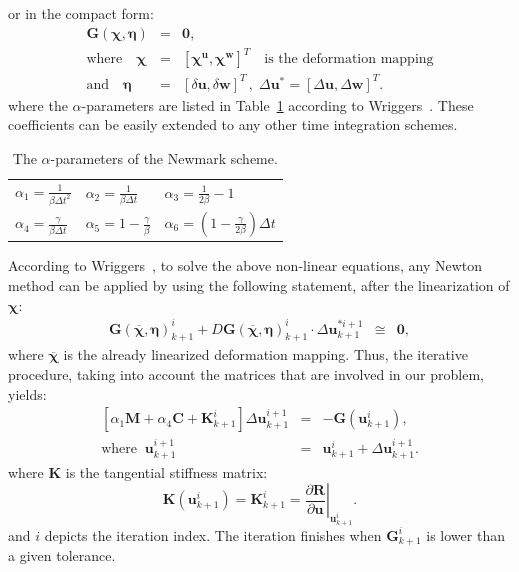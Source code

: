 \documentclass[preprint,12pt,a4paper]{elsarticle}
\begin{document}
or  in the compact form:
\begin{eqnarray} \label{eq_uw23}
\boldsymbol{G}(\boldsymbol{\chi},\boldsymbol{\eta})&=&\boldsymbol{0},\\
\mbox{where} \quad \boldsymbol{\chi}&=&\left[ \boldsymbol{\chi^u} ,\boldsymbol{\chi^w}\right]^{T} \quad  \mbox{is the deformation mapping}
\nonumber \\
\mbox{and} \quad 
\boldsymbol{\eta}&=&\left[\delta\boldsymbol{u},\delta\boldsymbol{w}\right]^T \, , \; \Delta\boldsymbol{u^*}=\left[\Delta\boldsymbol{u},\Delta\boldsymbol{w}\right]^T.
\nonumber
\end{eqnarray}
where the $\alpha$-parameters are listed in Table~\ref{tab1} according to Wriggers~\cite{wriggers:08}. These coefficients can be easily extended to any other time integration schemes. 

\begin{table}
\caption{\label{tab1} The $\alpha$-parameters of the Newmark scheme.} 
\centering
	\begin{tabular}{lll}
	 $\alpha_1=\frac{1}{\beta\Delta t^2}$ & 	 $\alpha_2=\frac{1}{\beta\Delta t}$ & 
	 $\alpha_3=\frac{1}{2\beta}-1$ \\
	 $\alpha_4=\frac{\gamma}{\beta\Delta t}$ &  
	 	 $\alpha_5=1-\frac{\gamma}{\beta}$&
	 $\alpha_6=\left(1-\frac{\gamma}{2\beta}\right)\Delta t$
	\end{tabular}
\end{table}

According to Wriggers~\cite{wriggers:08}, to solve the above non-linear equations, any Newton method  can be applied by using the following statement, after the linearization of $ \boldsymbol{\chi}$: 
\begin{eqnarray} \label{eq_uw24}
\boldsymbol{G}(\boldsymbol{\overline{\chi}},\boldsymbol{\eta})_{k+1}^{i}+D\boldsymbol{G}(\boldsymbol{\overline{\chi}},\boldsymbol{\eta})_{k+1}^{i}\cdot \Delta\boldsymbol{u}^{*i+1}_{k+1} &\cong & \boldsymbol{0},
\end{eqnarray}
where $\boldsymbol{\overline{\chi}}$ is the already linearized deformation mapping. Thus, the iterative procedure, taking into account the matrices that are involved in our problem, yields:
\begin{eqnarray}\label{eq_uw32}
\left[\alpha_1\boldsymbol {M}+\alpha_4\boldsymbol {C}+\boldsymbol {K}^{i}_{k+1}\right]\Delta\boldsymbol{u}^{i+1}_{k+1} &=& -\boldsymbol {G}(\boldsymbol {u}^{i}_{k+1}), \\
\mbox{where}\;\; \boldsymbol {u}^{i+1}_{k+1} &=& \boldsymbol {u}^{i}_{k+1} + \Delta \boldsymbol {u}^{i+1}_{k+1}.  \nonumber 
\end{eqnarray}
where $\boldsymbol {K}$ is the tangential stiffness matrix:
\begin{equation}\label{eq_uw31}
\boldsymbol {K}(\boldsymbol {u}^{i}_{k+1})=\boldsymbol {K}^{i}_{k+1}=\left.\frac{\partial\boldsymbol {R}}{\partial \boldsymbol {u}}\right|_{\boldsymbol{u}^{i}_{k+1}}.
\end{equation}
and $i$ depicts the iteration index. The iteration finishes when  $\boldsymbol {G}^{i}_{k+1}$ is lower than a given tolerance.
\end{document}
